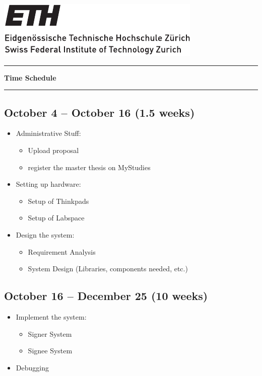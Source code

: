 \documentclass[a4paper, 11pt]{article}
\begin{document}
\includegraphics[scale=1]{../images/ETHlogo_13.pdf}
\vspace{10pt}
\hrule
\vspace{10pt}

\begin{center}
    {\LARGE
    \textbf{\Huge{Time Schedule}}}
\end{center}

\vspace{10pt}
\hrule

\subsection*{October 4 -- October 16 (1.5 weeks)}
\begin{itemize}
    \item Administrative Stuff: 
    \begin{itemize}
        \item Upload proposal
        \item register the master thesis on MyStudies
    \end{itemize}

    \item Setting up hardware: 
    \begin{itemize}
        \item Setup of Thinkpads
        \item Setup of Labspace
    \end{itemize}
 
    \item Design the system: 
    \begin{itemize}
        \item Requirement Analysis
        \item System Design (Libraries, components needed, etc.)
    \end{itemize}
\end{itemize}

\subsection*{October 16 -- December 25 (10 weeks)}
\begin{itemize}
    \item Implement the system: 
    \begin{itemize}
        \item Signer System
        \item Signee System
    \end{itemize}
    
    \item Debugging
\end{itemize}
\end{document}
